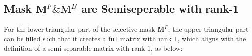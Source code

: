 \subsection{Mask $\mathbf{M}^F \& \mathbf{M}^B$ are Semiseperable with rank-1} \label{ap:rankmask}

For the lower triangular part of the selective mask \(\mathbf{M}^F\), the upper triangular part can be filled such that it creates a full matrix with rank 1, which aligns with the definition of a semi-separable matrix with rank 1, as below:

\setlength{\arrayrulewidth}{2.5pt}
